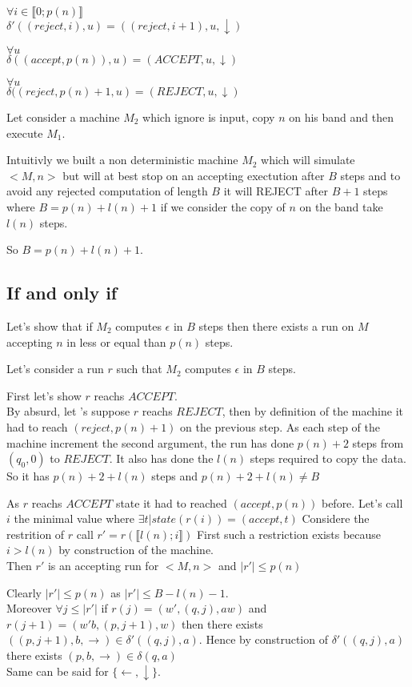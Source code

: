 $\forall i \in \llbracket 0;p(n) \rrbracket$
\\$\delta'((reject,i),u) = ((reject,i+1),u,\downarrow)$

$\forall u$
\\$\delta((accept,p(n)),u) = (ACCEPT,u,\downarrow)$

$\forall u$
\\$\delta((reject,p(n)+1,u) = (REJECT,u,\downarrow)$

Let consider a machine $M_2$ which ignore is input, copy $n$ on his band and then execute $M_1$. 

Intuitivly we built a non deterministic machine $M_2$ which will simulate $<M,n>$ but will at best stop on an accepting exectution after $B$ steps and to avoid any rejected computation of length $B$ it will REJECT after $B+1$ steps where $B = p(n) + l(n) +1$ if we consider the copy of $n$ on the band take $l(n)$ steps.

So $B = p(n) + l(n) +1$.

\subsection{If and only if}

Let's show that if $M_2$ computes $\epsilon$ in $B$ steps then there exists a run on $M$ accepting $n$ in less or equal than $p(n)$ steps.

Let's consider a run $r$ such that $M_2$ computes $\epsilon$ in $B$ steps. 

First let's show $r$ reachs $ACCEPT$.
\\By absurd, let 's suppose $r$ reachs $REJECT$, then by definition of the machine it had to reach $(reject,p(n)+1)$ on the previous step. As each step of the machine increment the second argument, the run has done $p(n)+2$ steps from $(q_0,0)$ to $REJECT$. It also has done the $l(n)$ steps required to copy the data. So it has $p(n)+2+l(n)$ steps and $p(n)+2+l(n) \neq B$

As $r$ reachs $ACCEPT$ state it had to reached $(accept,p(n))$ before. Let's call $i$ the minimal value where $\exists t | state(r(i)) = (accept,t)$
Considere the restrition of $r$ call $r'= r(\llbracket l(n) ; i \rrbracket)$
First such a restriction exists because $i>l(n)$ by construction of the machine.
\\Then $r'$ is an accepting run for $<M,n>$ and $|r'| \leq p(n)$

Clearly $|r'| \leq p(n)$ as  $|r'| \leq B - l(n) -1$.
\\Moreover $\forall j \leq |r'|$ if   $r(j) = (w',(q,j),aw)$ and  $r(j+1) = (w' b,(p,j+1),w)$ then there exists $((p,j+1),b,\rightarrow) \in \delta'((q,j),a)$. Hence by construction of $\delta'((q,j),a)$ there exists $(p,b,\rightarrow) \in \delta(q,a)$
\\Same can be said for $\{\leftarrow, \downarrow \}$.


